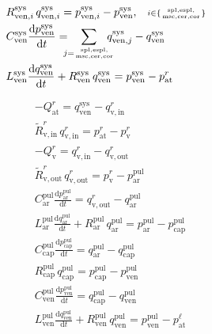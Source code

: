 \documentclass[a4paper,12pt]{report}
\begin{document}
\begin{align}
&R_{\mathrm{ven},i}^{\mathrm{sys}}\,q_{\mathrm{ven},i}^{\mathrm{sys}} = p_{\mathrm{ven},i}^{\mathrm{sys}}-p_{\mathrm{ven}}^{\mathrm{sys}}, \quad\scriptstyle{i\in\{\mathrm{spl,espl,\atop msc,cer,cor}\}}\nonumber\\
&C_{\mathrm{ven}}^{\mathrm{sys}} \frac{\mathrm{d}p_{\mathrm{ven}}^{\mathrm{sys}}}{\mathrm{d}t} = \!\!\!\!\sum_{j=\mathrm{spl,espl,\atop msc,cer,cor}}\!\!\!\!\!q_{\mathrm{ven},j}^{\mathrm{sys}}-q_{\mathrm{ven}}^{\mathrm{sys}}\nonumber\\
&L_{\mathrm{ven}}^{\mathrm{sys}}\frac{\mathrm{d}q_{\mathrm{ven}}^{\mathrm{sys}}}{\mathrm{d}t} + R_{\mathrm{ven}}^{\mathrm{sys}}\, q_{\mathrm{ven}}^{\mathrm{sys}} = p_{\mathrm{ven}}^{\mathrm{sys}} - p_{\mathrm{at}}^{r}\nonumber
\end{align}

\begin{align}
&-Q_{\mathrm{at}}^{r} = q_{\mathrm{ven}}^{\mathrm{sys}} - q_{\mathrm{v,in}}^{r}\nonumber\\
&\tilde{R}_{\mathrm{v,in}}^{r}\,q_{\mathrm{v,in}}^{r} = p_{\mathrm{at}}^{r}-p_{\mathrm{v}}^{r}\nonumber\\
&-Q_{\mathrm{v}}^{r} = q_{\mathrm{v,in}}^{r} - q_{\mathrm{v,out}}^{r}\nonumber\\
&\tilde{R}_{\mathrm{v,out}}^{r}\,q_{\mathrm{v,out}}^{r} = p_{\mathrm{v}}^{r}-p_{\mathrm{ar}}^{\mathrm{pul}}\nonumber\\
&C_{\mathrm{ar}}^{\mathrm{pul}} \frac{\mathrm{d}p_{\mathrm{ar}}^{\mathrm{pul}}}{\mathrm{d}t} = q_{\mathrm{v,out}}^{r} - q_{\mathrm{ar}}^{\mathrm{pul}}\nonumber\\
&L_{\mathrm{ar}}^{\mathrm{pul}}\frac{\mathrm{d}q_{\mathrm{ar}}^{\mathrm{pul}}}{\mathrm{d}t} + R_{\mathrm{ar}}^{\mathrm{pul}}\,q_{\mathrm{ar}}^{\mathrm{pul}}=p_{\mathrm{ar}}^{\mathrm{pul}} -p_{\mathrm{cap}}^{\mathrm{pul}}\nonumber\\
&C_{\mathrm{cap}}^{\mathrm{pul}} \frac{\mathrm{d}p_{\mathrm{cap}}^{\mathrm{pul}}}{\mathrm{d}t} = q_{\mathrm{ar}}^{\mathrm{pul}} - q_{\mathrm{cap}}^{\mathrm{pul}}\nonumber\\
&R_{\mathrm{cap}}^{\mathrm{pul}}\,q_{\mathrm{cap}}^{\mathrm{pul}}=p_{\mathrm{cap}}^{\mathrm{pul}}-p_{\mathrm{ven}}^{\mathrm{pul}}\nonumber\\
&C_{\mathrm{ven}}^{\mathrm{pul}} \frac{\mathrm{d}p_{\mathrm{ven}}^{\mathrm{pul}}}{\mathrm{d}t} = q_{\mathrm{cap}}^{\mathrm{pul}} - q_{\mathrm{ven}}^{\mathrm{pul}}\nonumber\\
&L_{\mathrm{ven}}^{\mathrm{pul}}\frac{\mathrm{d}q_{\mathrm{ven}}^{\mathrm{pul}}}{\mathrm{d}t} + R_{\mathrm{ven}}^{\mathrm{pul}}\, q_{\mathrm{ven}}^{\mathrm{pul}}=p_{\mathrm{ven}}^{\mathrm{pul}}-p_{\mathrm{at}}^{\ell}\nonumber
\end{align}
\end{document}
